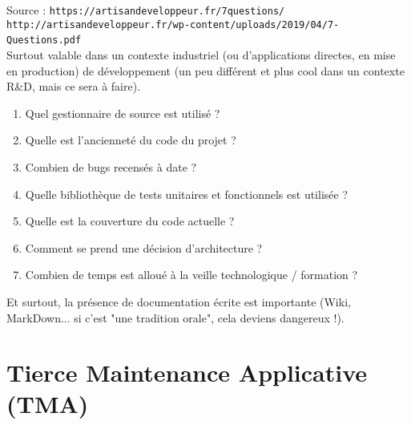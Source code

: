 \documentclass[11pt,twoside,a4paper]{article}
\begin{document}
\begin{landscape}
\begin{multicols}{2}
	Source : \texttt{https://artisandeveloppeur.fr/7questions/}~\\
	\texttt{http://artisandeveloppeur.fr/wp-content/uploads/2019/04/7-Questions.pdf}~\\
	
	
	Surtout valable dans un contexte industriel (ou d'applications directes, en mise en production) de d{\'e}veloppement (un peu diff{\'e}rent et plus cool dans un contexte R\&D, mais ce sera {\`a} faire).  
	\begin{enumerate}
		\item Quel gestionnaire de source est utilis{\'e} ?
		\item Quelle est l'anciennet{\'e} du code du projet ?
		\item Combien de bugs recens{\'e}s {\`a} date ?
		\item Quelle biblioth{\`e}que de tests unitaires et fonctionnels est utilis{\'e}e ?
		\item Quelle est la couverture du code actuelle ?
		\item Comment se prend une d{\'e}cision d'architecture ?
		\item Combien de temps est allou{\'e} {\`a} la veille technologique / formation ? 
	\end{enumerate}
	
	Et surtout, la pr{\'e}sence de documentation {\'e}crite est importante (Wiki, MarkDown... si c'est "une tradition orale", cela deviens dangereux !). 
	
	\vfill
	\columnbreak
	
	\section*{Tierce Maintenance Applicative (TMA)}
	

\end{multicols}
\end{landscape}
\end{document}
